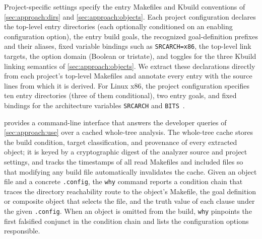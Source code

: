 \documentclass[acmsmall,screen,review,anonymous,nonacm]{acmart}
\begin{document}
Project-specific settings specify the entry Makefiles and Kbuild conventions of \autoref{sec:approach:dirs} and \autoref{sec:approach:objects}.
Each project configuration declares the top-level entry directories (each optionally conditioned on an enabling configuration option), the entry build goals, the recognized goal-definition prefixes and their aliases, fixed variable bindings such as \texttt{SRCARCH=x86}, the top-level link targets, the option domain (Boolean or tristate), and toggles for the three Kbuild linking semantics of \autoref{sec:approach:objects}.
We extract these declarations directly from each project's top-level Makefiles and annotate every entry with the source lines from which it is derived.
For Linux x86, the project configuration specifies ten entry directories (three of them conditional), two entry goals, and fixed bindings for the architecture variables \texttt{SRCARCH} and \texttt{BITS}~\cite{gazzillo2017kmax}.

\tool{} provides a command-line interface that answers the developer queries of \autoref{sec:approach:use} over a cached whole-tree analysis.
The whole-tree cache stores the build condition, target classification, and provenance of every extracted object; it is keyed by a cryptographic digest of the analyzer source and project settings, and tracks the timestamps of all read Makefiles and included files so that modifying any build file automatically invalidates the cache.
Given an object file and a concrete \texttt{.config}, the \texttt{why} command reports a condition chain that traces the directory reachability route to the object's Makefile, the goal definition or composite object that selects the file, and the truth value of each clause under the given \texttt{.config}.
When an object is omitted from the build, \texttt{why} pinpoints the first falsified conjunct in the condition chain and lists the configuration options responsible.
\end{document}
